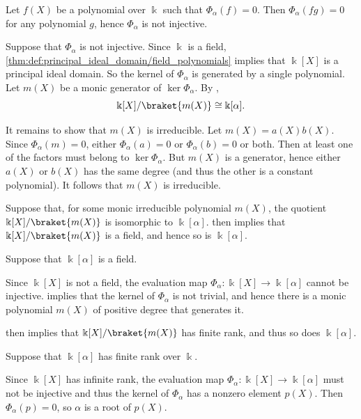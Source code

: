 \begin{defproof}
   Let \( f(X) \) be a polynomial over \( \Bbbk \) such that \( \Phi_\alpha(f) = 0 \). Then \( \Phi_\alpha(fg) = 0 \) for any polynomial \( g \), hence \( \Phi_\alpha \) is not injective.

   Suppose that \( \Phi_\alpha \) is not injective. Since \( \Bbbk \) is a field, \cref{thm:def:principal_ideal_domain/field_polynomials} implies that \( \Bbbk[X] \) is a principal ideal domain. So the kernel of \( \Phi_\alpha \) is generated by a single polynomial. Let \( m(X) \) be a monic generator of \( \ker \Phi_\alpha \). By ,
  \begin{equation*}
    \Bbbk[X] / \braket{ m(X) } \cong \Bbbk[\alpha].
  \end{equation*}

  It remains to show that \( m(X) \) is irreducible. Let \( m(X) = a(X) b(X) \). Since \( \Phi_\alpha(m) = 0 \), either \( \Phi_\alpha(a) = 0 \) or \( \Phi_\alpha(b) = 0 \) or both. Then at least one of the factors must belong to \( \ker \Phi_\alpha \). But \( m(X) \) is a generator, hence either \( a(X) \) or \( b(X) \) has the same degree (and thus the other is a constant polynomial). It follows that \( m(X) \) is irreducible.

   Suppose that, for some monic irreducible polynomial \( m(X) \), the quotient \( \Bbbk[X] / \braket{ m(X) } \) is isomorphic to \( \Bbbk[\alpha] \).  then implies that \( \Bbbk[X] / \braket{ m(X) } \) is a field, and hence so is \( \Bbbk[\alpha] \).

   Suppose that \( \Bbbk[\alpha] \) is a field.

  Since \( \Bbbk[X] \) is not a field, the evaluation map \( \Phi_\alpha: \Bbbk[X] \to \Bbbk[\alpha] \) cannot be injective.  implies that the kernel of \( \Phi_\alpha \) is not trivial, and hence there is a monic polynomial \( m(X) \) of positive degree that generates it.

   then implies that \( \Bbbk[X] / \braket{ m(X) } \) has finite rank, and thus so does \( \Bbbk[\alpha] \).

   Suppose that \( \Bbbk[\alpha] \) has finite rank over \( \Bbbk \).

  Since \( \Bbbk[X] \) has infinite rank, the evaluation map \( \Phi_\alpha: \Bbbk[X] \to \Bbbk[\alpha] \) must not be injective and thus the kernel of \( \Phi_\alpha \) has a nonzero element \( p(X) \). Then \( \Phi_\alpha(p) = 0 \), so \( \alpha \) is a root of \( p(X) \).
\end{defproof}

